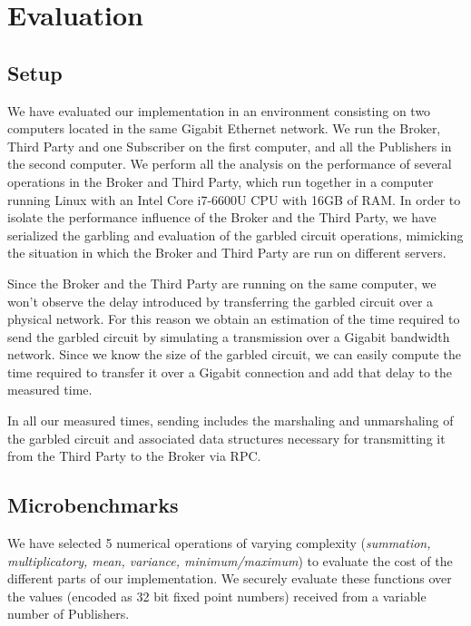 \section{Evaluation}
\label{sec:evaluation}

\subsection{Setup}



We have evaluated our implementation in an environment consisting on two
computers located in the same Gigabit Ethernet network.  We run the Broker,
Third Party and one Subscriber on the first computer, and all the Publishers in
the second computer.  We perform all the analysis on the performance of several
operations in the Broker and Third Party, which run together in a computer
running Linux with an Intel Core i7-6600U CPU with 16GB of RAM.  In order to
isolate the performance influence of the Broker and the Third Party, we have
serialized the garbling and evaluation of the garbled circuit operations,
mimicking the situation in which the Broker and Third Party are run on
different servers.

Since the Broker and the Third Party are running on the same computer, we won't
observe the delay introduced by transferring the garbled circuit over a
physical network.  For this reason we obtain an estimation of the time required
to send the garbled circuit by simulating a transmission over a Gigabit
bandwidth network.  Since we know the size of the garbled circuit, we can
easily compute the time required to transfer it over a Gigabit connection and
add that delay to the measured time.

In all our measured times, sending includes the marshaling and unmarshaling of
the garbled circuit and associated data structures necessary for transmitting
it from the Third Party to the Broker via RPC.

\subsection{Microbenchmarks}

We have selected 5 numerical operations of varying complexity (\emph{summation,
multiplicatory, mean, variance, minimum/maximum}) to evaluate the cost of the
different parts of our implementation.  We securely evaluate these functions
over the values (encoded as 32 bit fixed point numbers) received from a
variable number of Publishers.

